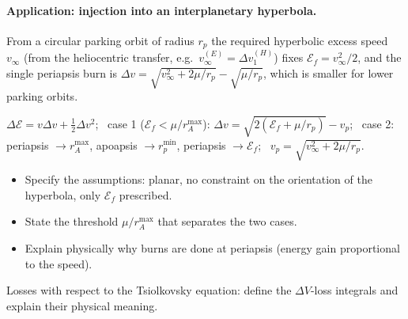 \paragraph{Application: injection into an interplanetary hyperbola.} From a circular parking orbit of radius $r_p$
the required hyperbolic excess speed $v_\infty$ (from the heliocentric transfer, e.g.\ $v_\infty^{(E)}=\Delta v_1^{(H)}$) fixes
$\mathcal E_f=v_\infty^2/2$, and the single periapsis burn is
$\Delta v=\sqrt{v_\infty^2+2\mu/r_p}-\sqrt{\mu/r_p}$, which is smaller for lower parking orbits.

\begin{keyf}
$\Delta\mathcal E=v\Delta v+\tfrac12\Delta v^2$; \ case 1 ($\mathcal E_f<\mu/r_A^{\max}$): $\Delta v=\sqrt{2(\mathcal E_f+\mu/r_p)}-v_p$;
\ case 2: periapsis $\to r_A^{\max}$, apoapsis $\to r_p^{\min}$, periapsis $\to\mathcal E_f$; \ $v_p=\sqrt{v_\infty^2+2\mu/r_p}$.
\end{keyf}

\pitfalls
\begin{itemize}
\item Specify the assumptions: planar, no constraint on the orientation of the hyperbola, only $\mathcal E_f$ prescribed.
\item State the threshold $\mu/r_A^{\max}$ that separates the two cases.
\item Explain physically why burns are done at periapsis (energy gain proportional to the speed).
\end{itemize}


\begin{qbox}
Losses with respect to the Tsiolkovsky equation: define the $\Delta V$-loss integrals and explain their physical meaning.
\end{qbox}


